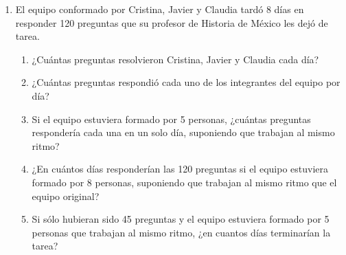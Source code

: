 \documentclass[11pt]{book}
\begin{document}
\begin{enumerate}
  \item El equipo conformado por Cristina, Javier y Claudia tardó 8 días en responder 120 preguntas que su profesor de Historia de México les dejó de tarea.
        \begin{enumerate}
          \item ¿Cuántas preguntas resolvieron Cristina, Javier y Claudia cada día?
          \item ¿Cuántas preguntas respondió cada uno de los integrantes del equipo por día?
          \item Si el equipo estuviera formado por 5 personas, ¿cuántas preguntas respondería cada una en un solo día, suponiendo que trabajan al mismo ritmo?
          \item ¿En cuántos días responderían las 120 preguntas si el equipo estuviera formado por 8 personas, suponiendo que trabajan al mismo ritmo que el equipo original?
          \item Si sólo hubieran sido 45 preguntas y el equipo estuviera formado por 5 personas que trabajan al mismo ritmo, ¿en cuantos días terminarían la tarea?
        \end{enumerate}


\end{enumerate}
\end{document}
